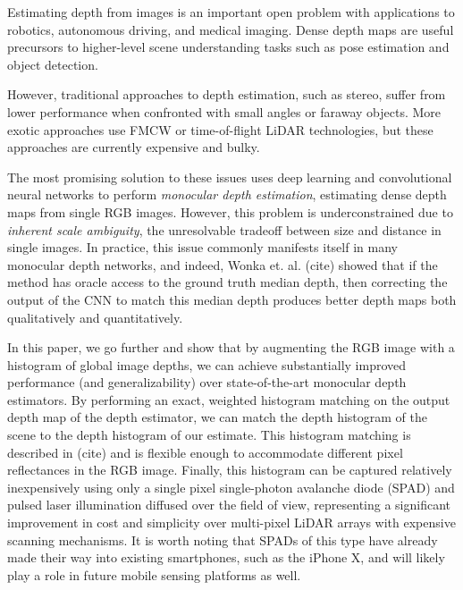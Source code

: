 Estimating depth from images is an important open problem with applications
to robotics, autonomous driving, and medical imaging. Dense depth maps are
useful precursors to higher-level scene understanding tasks such as pose
estimation and object detection.

However, traditional approaches to depth estimation, such as stereo, suffer from lower performance
when confronted with small angles or faraway objects.
More exotic approaches use FMCW or time-of-flight LiDAR technologies,
but these approaches are currently expensive and bulky. 

The most promising solution to these issues uses deep learning and 
convolutional neural networks to perform \textit{monocular depth estimation},
estimating dense depth maps from single RGB images. 
However, this problem is underconstrained due to \textit{inherent scale ambiguity}, the unresolvable
tradeoff between size and distance in single images. In practice, this issue commonly
manifests itself in many monocular depth networks, and indeed, 
Wonka et. al. (cite) showed that if the method has oracle access to the ground truth
median depth, then correcting the output of the CNN to match this median
depth produces better depth maps both qualitatively and quantitatively.

In this paper, we go further and show that by augmenting the RGB image with a histogram of
global image depths, we can achieve substantially improved performance
(and generalizability) over state-of-the-art monocular depth
estimators. By performing an exact, weighted histogram matching on the output
depth map of the depth estimator, we can match the depth histogram of the scene
to the depth histogram of our estimate. This histogram matching is described in
(cite) and is flexible enough to accommodate different pixel reflectances in the
RGB image. Finally, this histogram can be captured
relatively inexpensively using only a single pixel single-photon avalanche diode
(SPAD) and pulsed laser illumination diffused over the field of view, 
representing a significant improvement in cost and simplicity over multi-pixel LiDAR
arrays with expensive scanning mechanisms. It is
worth noting that SPADs of this type have already made their way into existing
smartphones, such as the iPhone X, and will likely play a role in future mobile sensing platforms as well.

